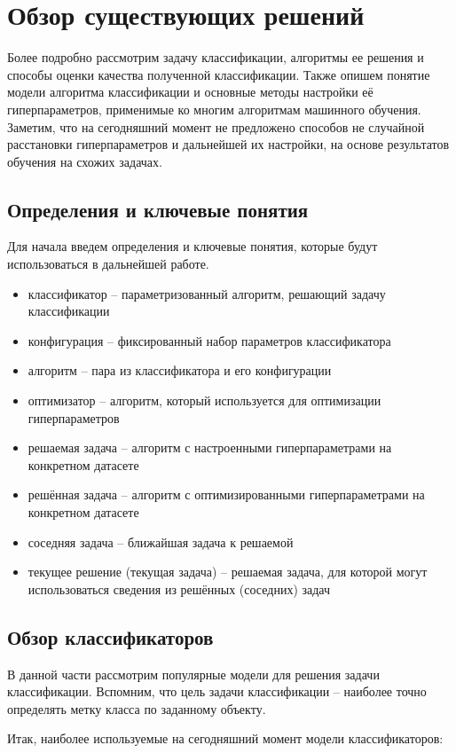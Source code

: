 \documentclass[times,specification,annotation]{itmo-student-thesis}
\begin{document}
	
	\chapter{Обзор существующих решений}\label{chp1}
	Более подробно рассмотрим задачу классификации, алгоритмы ее решения и способы оценки качества полученной классификации. Также опишем понятие модели алгоритма классификации и основные методы настройки её гиперпараметров, применимые ко многим алгоритмам машинного обучения.
	Заметим, что на сегодняшний момент не предложено способов не случайной расстановки гиперпараметров и дальнейшей их настройки, на основе результатов обучения на схожих задачах.
	\startrelatedwork
	
	\section{Определения и ключевые понятия}
	Для начала введем определения и ключевые понятия, которые будут использоваться в дальнейшей работе.
	\begin{itemize}
		\item классификатор -- параметризованный алгоритм, решающий задачу классификации
		\item конфигурация -- фиксированный набор параметров классификатора
		\item алгоритм -- пара из классификатора и его конфигурации 
		\item оптимизатор -- алгоритм, который используется для оптимизации гиперпараметров
		\item решаемая задача -- алгоритм с настроенными гиперпараметрами на конкретном датасете
		\item решённая задача -- алгоритм с оптимизированными гиперпараметрами на конкретном датасете
		\item соседняя задача -- ближайшая задача к решаемой
		\item текущее решение (текущая задача) -- решаемая задача, для которой могут использоваться сведения из решённых (соседних) задач
	\end{itemize}
	\section{Обзор классификаторов}
	В данной части рассмотрим популярные модели для решения задачи классификации. Вспомним, что цель задачи классификации -- наиболее точно определять метку класса по заданному объекту. \par
	Итак, наиболее используемые на сегодняшний момент модели классификаторов:
	
\end{document}
